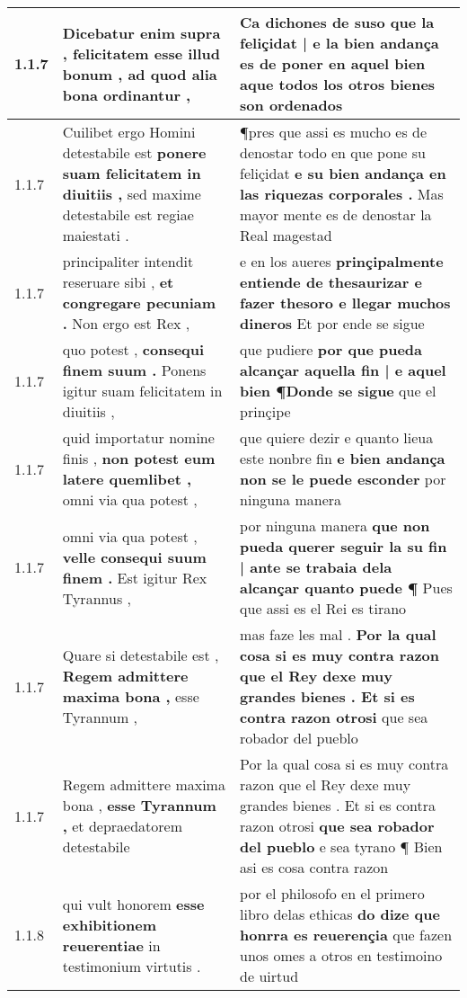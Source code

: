 \begin{tabular}{|p{1cm}|p{6.5cm}|p{6.5cm}|}
1.1.7 & Dicebatur enim supra , \textbf{ felicitatem esse illud bonum , } ad quod alia bona ordinantur , & Ca dichones de suso \textbf{ que la feliçidat | e la bien andança es de poner en aquel bien } aque todos los otros bienes son ordenados \\\hline
1.1.7 & Cuilibet ergo Homini detestabile est \textbf{ ponere suam felicitatem in diuitiis , } sed maxime detestabile est regiae maiestati . & ¶pres que assi es mucho es de denostar todo en que pone su feliçidat \textbf{ e su bien andança en las riquezas corporales . } Mas mayor mente es de denostar la Real magestad \\\hline
1.1.7 & principaliter intendit reseruare sibi , \textbf{ et congregare pecuniam . } Non ergo est Rex , & e en los aueres \textbf{ prinçipalmente entiende de thesaurizar e fazer thesoro e llegar muchos dineros } Et por ende se sigue \\\hline
1.1.7 & quo potest , \textbf{ consequi finem suum . } Ponens igitur suam felicitatem in diuitiis , & que pudiere \textbf{ por que pueda alcançar aquella fin | e aquel bien ¶Donde se sigue } que el prinçipe \\\hline
1.1.7 & quid importatur nomine finis , \textbf{ non potest eum latere quemlibet , } omni via qua potest , & que quiere dezir e quanto lieua este nonbre fin \textbf{ e bien andança non se le puede esconder } por ninguna manera \\\hline
1.1.7 & omni via qua potest , \textbf{ velle consequi suum finem . } Est igitur Rex Tyrannus , & por ninguna manera \textbf{ que non pueda querer seguir la su fin | ante se trabaia dela alcançar quanto puede ¶ } Pues que assi es el Rei es tirano \\\hline
1.1.7 & Quare si detestabile est , \textbf{ Regem admittere maxima bona , } esse Tyrannum , & mas faze les mal . \textbf{ Por la qual cosa si es muy contra razon que el Rey dexe muy grandes bienes . Et si es contra razon otrosi } que sea robador del pueblo \\\hline
1.1.7 & Regem admittere maxima bona , \textbf{ esse Tyrannum , } et depraedatorem detestabile & Por la qual cosa si es muy contra razon que el Rey dexe muy grandes bienes . Et si es contra razon otrosi \textbf{ que sea robador del pueblo } e sea tyrano ¶ Bien asi es cosa contra razon \\\hline
1.1.8 & qui vult honorem \textbf{ esse exhibitionem reuerentiae } in testimonium virtutis . & por el philosofo en el primero libro delas ethicas \textbf{ do dize que honrra es reuerençia } que fazen unos omes a otros en testimoino de uirtud \\\hline

\end{tabular}
